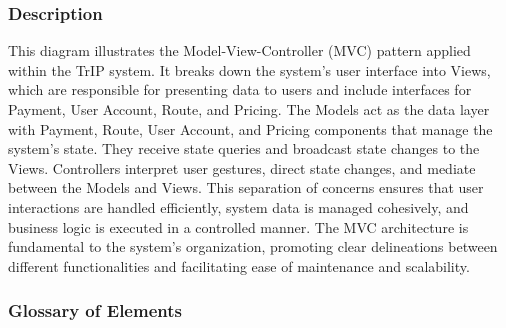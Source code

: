 \subsubsection{Description}
This diagram illustrates the Model-View-Controller (MVC) pattern applied within the TrIP system. It breaks down the system's user interface into Views, which are responsible for presenting data to users and include interfaces for Payment, User Account, Route, and Pricing. The Models act as the data layer with Payment, Route, User Account, and Pricing components that manage the system's state. They receive state queries and broadcast state changes to the Views. Controllers interpret user gestures, direct state changes, and mediate between the Models and Views. This separation of concerns ensures that user interactions are handled efficiently, system data is managed cohesively, and business logic is executed in a controlled manner. The MVC architecture is fundamental to the system's organization, promoting clear delineations between different functionalities and facilitating ease of maintenance and scalability.

\subsubsection{Glossary of Elements}

